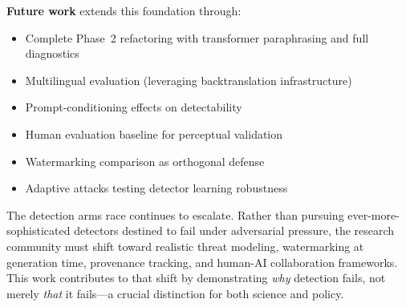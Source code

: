 \documentclass[conference]{IEEEtran}
\begin{document}
\textbf{Future work} extends this foundation through:
\begin{itemize}
    \item Complete Phase~2 refactoring with transformer paraphrasing and full diagnostics
    \item Multilingual evaluation (leveraging backtranslation infrastructure)
    \item Prompt-conditioning effects on detectability
    \item Human evaluation baseline for perceptual validation
    \item Watermarking comparison as orthogonal defense
    \item Adaptive attacks testing detector learning robustness
\end{itemize}

The detection arms race continues to escalate. Rather than pursuing ever-more-sophisticated detectors destined to fail under adversarial pressure, the research community must shift toward realistic threat modeling, watermarking at generation time, provenance tracking, and human-AI collaboration frameworks. This work contributes to that shift by demonstrating \emph{why} detection fails, not merely \emph{that} it fails—a crucial distinction for both science and policy.
\end{document}

